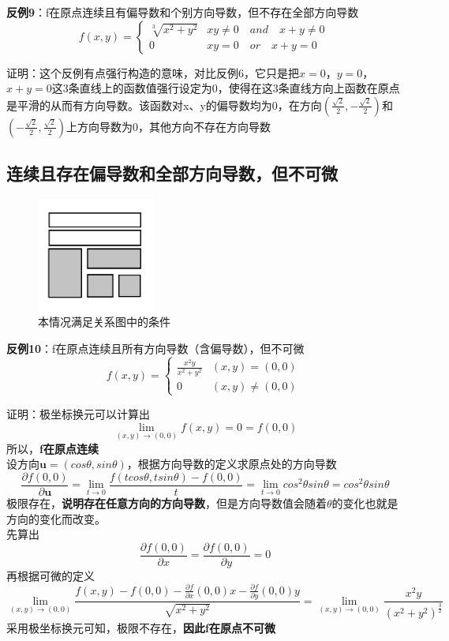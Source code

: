 \documentclass{article}
\begin{document}
\textbf{反例9}：f在原点连续且有偏导数和个别方向导数，但不存在全部方向导数
\[f(x,y)= \begin{cases}  \sqrt[3]{x^2+y^2}  & xy \neq 0 \quad and \quad x+y \neq 0 \\ 0 & xy = 0 \quad or \quad x+y = 0\end{cases}\ \]

证明：这个反例有点强行构造的意味，对比反例6，它只是把$x=0$，$y=0$，$x+y=0$这3条直线上的函数值强行设定为0，使得在这3条直线方向上函数在原点是平滑的从而有方向导数。该函数对x、y的偏导数均为0，在方向$\left(  \frac{\sqrt{2}}{2} , - \frac{\sqrt{2}}{2} \right)$和$\left(  -\frac{\sqrt{2}}{2} , \frac{\sqrt{2}}{2} \right)$上方向导数为0，其他方向不存在方向导数

\newpage

\subsection{连续且存在偏导数和全部方向导数，但不可微}
\begin{figure}[!h]
    \centering
    \includegraphics[width=0.35\textwidth]{pic/11.png}
    \caption{本情况满足关系图中的条件}
\end{figure}

\textbf{反例10}：f在原点连续且所有方向导数（含偏导数），但不可微
\[f(x,y)= \begin{cases}  \frac{x^2y}{x^2+y^2}  & (x,y) = (0,0)  \\ 0 & (x,y) \neq (0,0) \end{cases}\ \]

证明：极坐标换元可以计算出
\[\lim\limits_{(x,y) \rightarrow (0,0)} f(x,y) = 0 = f(0,0)\]
所以，\textbf{f在原点连续}\\
设方向$\mathbf{u}=(cos\theta,sin\theta)$，根据方向导数的定义求原点处的方向导数
\[\frac{\partial f(0,0)}{\partial \mathbf{u}}=  \lim\limits_{t \rightarrow 0} \frac{f(tcos\theta,tsin\theta)-f(0,0)}{t} = \lim\limits_{t \rightarrow 0} cos^2\theta sin\theta = cos^2\theta sin\theta\]
极限存在，\textbf{说明存在任意方向的方向导数}，但是方向导数值会随着$\theta$的变化也就是方向的变化而改变。\\
先算出
\[\frac{\partial f(0,0)}{\partial x} = \frac{\partial f(0,0)}{\partial y} = 0\]
再根据可微的定义
\[\lim\limits_{(x,y) \rightarrow (0,0)} \frac{ f(x,y)-f(0,0) - \frac{\partial f}{\partial x}(0,0) x - \frac{\partial f}{\partial y}(0,0) y}{ \sqrt{x^2 + y^2} }
=\lim\limits_{(x,y) \rightarrow (0,0)} \frac{x^2y}{(x^2+y^2)^{\frac{3}{2}}}\]
采用极坐标换元可知，极限不存在，\textbf{因此f在原点不可微}
\end{document}
